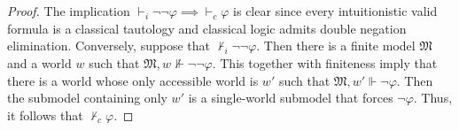 \documentclass[a4paper]{article}
\newcommand{\M}{\mathfrak{M}}
\begin{document}
\section{}
\label{sec:4}

\begin{proof}
  The implication $\vdash_i \lnot\lnot \varphi \implies \vdash_c \varphi$ is clear since every intuitionistic valid formula is a classical tautology and classical logic admits double negation elimination.
  Conversely, suppose that $\nvdash_i \lnot\lnot \varphi$.
  Then there is a finite model $\M$ and a world $w$ such that $\M,w \nVdash \lnot\lnot \varphi$.
  This together with finiteness imply that there is a world whose only accessible world is $w'$ such that $\M,w' \Vdash \lnot \varphi$.
  Then the submodel containing only $w'$ is a single-world submodel that forces $\lnot \varphi$.
  Thus, it follows that $\nvdash_c \varphi$.
\end{proof}

\end{document}
